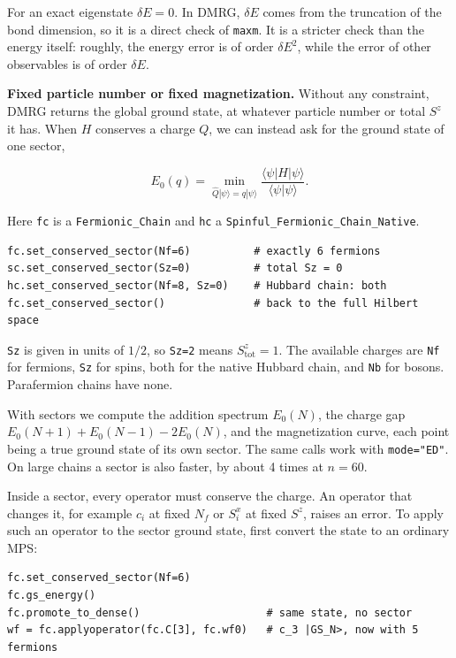 \documentclass[11pt]{article}
\begin{document}
For an exact eigenstate \(\delta E=0\). In DMRG, \(\delta E\) comes from the
truncation of the bond dimension, so it is a direct check of \texttt{maxm}. It is
a stricter check than the energy itself: roughly, the energy error is of
order \(\delta E^2\), while the error of other observables is of order
\(\delta E\).

\textbf{Fixed particle number or fixed magnetization.} Without any constraint,
DMRG returns the global ground state, at whatever particle number or total
\(S^z\) it has. When \(H\) conserves a charge \(Q\), we can instead ask for the
ground state of one sector,

\[E_0(q)=\min_{\hat Q|\psi\rangle=q|\psi\rangle}
\frac{\langle\psi|H|\psi\rangle}{\langle\psi|\psi\rangle}.\]

Here \texttt{fc} is a \texttt{Fermionic\_\allowbreak{}Chain} and \texttt{hc} a \texttt{Spinful\_\allowbreak{}Fermionic\_\allowbreak{}Chain\_\allowbreak{}Native}.

\begin{lstlisting}
fc.set_conserved_sector(Nf=6)          # exactly 6 fermions
sc.set_conserved_sector(Sz=0)          # total Sz = 0
hc.set_conserved_sector(Nf=8, Sz=0)    # Hubbard chain: both
fc.set_conserved_sector()              # back to the full Hilbert space
\end{lstlisting}

\texttt{Sz} is given in units of \(1/2\), so \texttt{Sz=2} means \(S^z_\mathrm{tot}=1\).
The available charges are \texttt{Nf} for fermions, \texttt{Sz} for spins, both for the
native Hubbard chain, and \texttt{Nb} for bosons. Parafermion chains have none.

With sectors we compute the addition spectrum \(E_0(N)\), the charge gap
\(E_0(N+1)+E_0(N-1)-2E_0(N)\), and the magnetization curve, each point being
a true ground state of its own sector. The same calls work with
\texttt{mode="ED"}. On large chains a sector is also faster, by about 4 times at
\(n=60\).

Inside a sector, every operator must conserve the charge. An operator that
changes it, for example \(c_i\) at fixed \(N_f\) or \(S^x_i\) at fixed \(S^z\),
raises an error. To apply such an operator to the sector ground state,
first convert the state to an ordinary MPS:

\begin{lstlisting}
fc.set_conserved_sector(Nf=6)
fc.gs_energy()
fc.promote_to_dense()                    # same state, no sector
wf = fc.applyoperator(fc.C[3], fc.wf0)   # c_3 |GS_N>, now with 5 fermions
\end{lstlisting}
\end{document}
